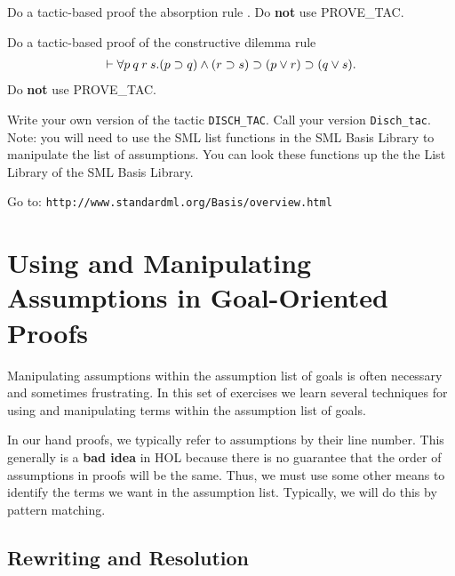 \begin{exercise}
  Do a tactic-based proof the absorption rule .  Do \textbf{not}
  use PROVE_TAC.
\end{exercise}

\begin{exercise}
  Do a tactic-based proof of the constructive dilemma rule
  \begin{gather*}
     \vdash {\forall p\:q\:r\:s.(p \supset q) \wedge (r \supset s)
      \supset(p \vee r) \supset(q \vee s)}.
  \end{gather*}
Do \textbf{not} use
  PROVE_TAC.
\end{exercise}

\begin{exercise}
  Write your own version of the tactic \verb|DISCH_TAC|.  Call your
  version \verb|Disch_tac|. Note: you will need to use the SML list
  functions in the SML Basis Library to manipulate the list of
  assumptions. You can look these functions up the the List Library of
  the SML Basis Library.

  Go to: \verb|http://www.standardml.org/Basis/overview.html|
\end{exercise}

\section{Using and Manipulating Assumptions in Goal-Oriented Proofs}
\label{sec:assumptions}

Manipulating assumptions within the assumption list of goals is often
necessary and sometimes frustrating. In this set of exercises we learn
several techniques for using and manipulating terms within the
assumption list of goals.

In our hand proofs, we typically refer to assumptions by their line
number. This generally is a \textbf{bad idea} in HOL because there is
no guarantee that the order of assumptions in proofs will be the
same. Thus, we must use some other means to identify the terms we want
in the assumption list.  Typically, we will do this by pattern
matching.

\subsection{Rewriting and Resolution}
\label{sec:resolution}


